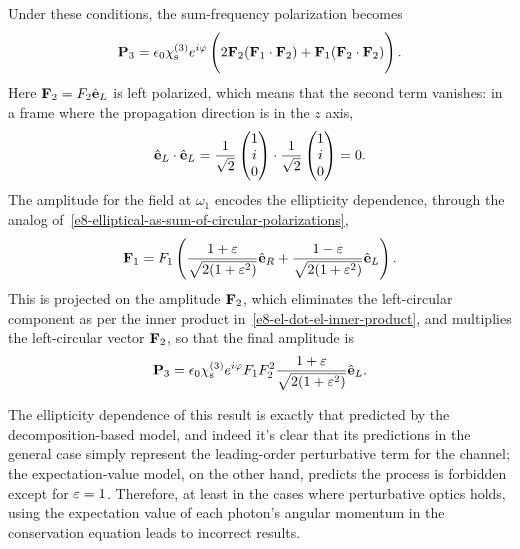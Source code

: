 Under these conditions, the sum-frequency polarization becomes
\begin{equation}
\vb{P}_3=\epsilon_0\chi^{(3)}_\text{s} e^{i\varphi} \left(\vphantom{\sum_i}
2\vb{F}_2(\vb{F}_1\cdot\vb{F}_2)+\vb{F}_1(\vb{F}_2\cdot\vb{F}_2)
\right).
\label{e8-nonlinear-polarization-inner-products}
\end{equation}
Here $\vb{F}_2=F_2\hat{\vb{e}}_L$ is left polarized, which means that the second term vanishes: in a frame where the propagation direction is in the $z$ axis,
\begin{equation}
 \hat{\vb{e}}_L\cdot\hat{\vb{e}}_L=
 \frac{1}{\sqrt{2}}\begin{pmatrix}1\\i\\0\end{pmatrix}
 \cdot
 \frac{1}{\sqrt{2}}\begin{pmatrix}1\\i\\0\end{pmatrix}
 =0.
\label{e8-el-dot-el-inner-product}
\end{equation}
The amplitude for the field at $\omega_1$ encodes the ellipticity dependence, through the analog of~\eqref{e8-elliptical-as-sum-of-circular-polarizations},
\begin{equation}
 \vb{F}_1=
 F_1
 \left(
 \frac{1+\varepsilon}{\sqrt{2(1+\varepsilon^2)}}\hat{\vb{e}}_R
 +
  \frac{1-\varepsilon}{\sqrt{2(1+\varepsilon^2)}}\hat{\vb{e}}_L
 \right).
 \label{e8-elliptical-driver-polarization-decomposition}
\end{equation}
This is projected on the amplitude $\vb{F}_2$, which eliminates the left-circular component as per the inner product in~\eqref{e8-el-dot-el-inner-product}, and multiplies the left-circular vector $\vb{F}_2$, so that the final amplitude is
\begin{equation}
\vb{P}_3=\epsilon_0\chi^{(3)}_\text{s} e^{i\varphi} F_1F_2^2 \frac{1+\varepsilon}{\sqrt{2(1+\varepsilon^2)}}\hat{\vb{e}}_L.
\label{e8-nonlinear-polarization-final-result}
\end{equation}





The ellipticity dependence of this result is exactly that predicted by the decomposition-based model, and indeed it's clear that its predictions in the general case simply represent the leading-order perturbative term for the channel; the expectation-value model, on the other hand, predicts the process is forbidden except for $\varepsilon=1$. Therefore, at least in the cases where perturbative optics holds, using the expectation value of each photon's angular momentum in the conservation equation leads to incorrect results. 

